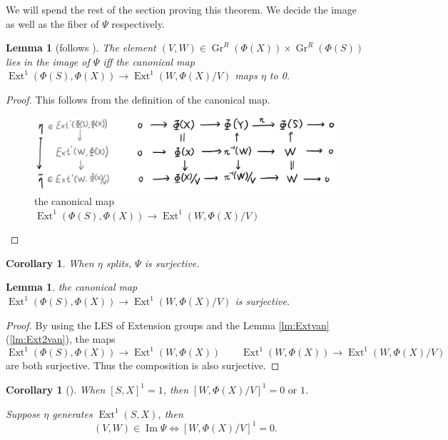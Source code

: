 \documentclass[reqno,11pt]{amsart}
\numberwithin{equation}{section}
\theoremstyle{plain}
\newtheorem{lemma}[theorem]{Lemma}
\newtheorem{corollary}[theorem]{Corollary}
\theoremstyle{plain}
\numberwithin{equation}{section}
\theoremstyle{remark}
\DeclareMathOperator{\Img}{\operatorname{Im}}
\DeclareMathOperator{\Ext}{\operatorname{Ext}}
\newcommand{\Grr}{\operatorname{Gr}^{R}}
\begin{document}
We will spend the rest of the section proving this theorem. We decide the image as well as the fiber of $\Psi$ respectively.
\begin{lemma}[follows {\cite[Lemma 21]{irelli2019cell}}]
The element $(V,W) \in \Grr(\Phi(X)) \times \Grr(\Phi(S))$ lies in the image of $\Psi$ iff the canonical map $\Ext^1(\Phi(S),\Phi(X)) \longrightarrow \Ext^1(W,\Phi(X)/V)$ maps $\eta$ to 0.
\end{lemma}
\begin{proof}
	This follows from the definition of the canonical map.
	
\begin{center}
	\begin{figure}[ht]\label{fig:extensiongroup}
		\vspace{0cm}
		\centering
		\includegraphics[width=15cm]{figures/extensiongroup.png}
		\caption{the canonical map $\Ext^1(\Phi(S),\Phi(X)) \longrightarrow \Ext^1(W,\Phi(X)/V)$}
	\end{figure}
\end{center}
\end{proof}
\begin{corollary}\label{cor:img1}
	When $\eta$ splits, $\Psi$ is surjective.
\end{corollary}
\begin{lemma}
	the canonical map $\Ext^1(\Phi(S),\Phi(X)) \longrightarrow \Ext^1(W,\Phi(X)/V)$ is surjective.
\end{lemma}
\begin{proof}
	By using the LES of Extension groups and the Lemma \ref{lm:Extvan}(\ref{lm:Ext2van}), the maps
	$$\Ext^1(\Phi(S),\Phi(X)) \longrightarrow \Ext^1(W,\Phi(X))\qquad \Ext^1(W,\Phi(X)) \longrightarrow \Ext^1(W,\Phi(X)/V)$$
	are both surjective. Thus the composition is also surjective.
\end{proof}
\begin{corollary}[]\label{cor:0or1}
	When $[S,X]^1=1$, then $[W,\Phi(X)/V]^1=0 \text{ or }1$.
	
	Suppose $\eta$ generates $\Ext^1(S,X)$, then 
	$$(V,W) \in \Img \Psi \iff [W,\Phi(X)/V]^1=0.$$
\end{corollary}
\end{document}
